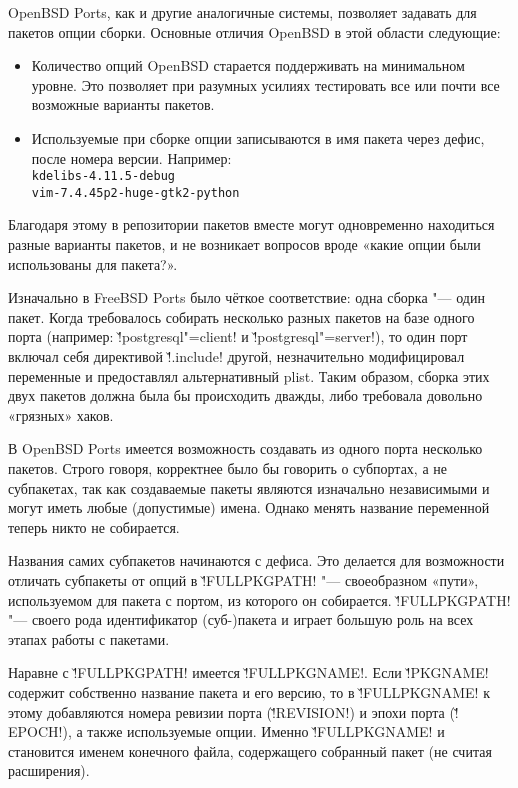 \documentclass[10pt, a5paper]{article}
\begin{document}
OpenBSD Ports, как и другие аналогичные системы, позволяет задавать для пакетов опции сборки. Основные отличия OpenBSD в этой области следующие:

\begin{itemize}
  \item Количество опций OpenBSD старается поддерживать на минимальном уровне. Это позволяет при разумных усилиях тестировать все или почти все возможные варианты пакетов.
  \item Используемые при сборке опции записываются в имя пакета через дефис, после номера версии. Например:\\
\verb!kdelibs-4.11.5-debug!\\
\verb!vim-7.4.45p2-huge-gtk2-python!
\end{itemize}


Благодаря этому в репозитории пакетов вместе могут одновременно находиться разные варианты пакетов, и не возникает вопросов вроде «какие опции были использованы для пакета?».

Изначально в FreeBSD Ports было чёткое соответствие: одна сборка "--- один пакет. Когда требовалось собирать несколько разных пакетов на базе одного порта (например: \v!postgresql"=client! и \v!postgresql"=server!), то один порт включал себя директивой \v!.in\-clu\-de! другой, незначительно модифицировал переменные и предоставлял альтернативный plist. Таким образом, сборка этих двух пакетов должна была бы происходить дважды, либо требовала довольно «грязных» хаков.

В OpenBSD Ports имеется возможность создавать из одного порта несколько пакетов. Строго говоря, корректнее было бы говорить о субпортах, а не субпакетах, так как создаваемые пакеты являются изначально независимыми и могут иметь любые (допустимые) имена. Однако менять название переменной теперь никто не собирается.

Названия самих субпакетов начинаются с дефиса. Это делается для возможности отличать субпакеты от опций в \v!FULL\-PKG\-PATH! "--- своеобразном «пути», используемом для пакета с портом, из которого он собирается. \v!FULL\-PKG\-PATH! "--- своего рода идентификатор (суб-)пакета и играет большую роль на всех этапах работы с пакетами.

Наравне с \v!FULLPKGPATH! имеется \v!FULL\-PKG\-NAME!. Если \v!PKG\-NAME! содержит собственно название пакета и его версию, то в \v!FULL\-PKG\-NAME! к этому добавляются номера ревизии порта (\v!RE\-VI\-SI\-ON!) и эпохи порта (\v!EPOCH!), а также используемые опции. Именно \v!FULL\-PKG\-NAME! и становится именем конечного файла, содержащего собранный пакет (не считая расширения).
\end{document}
